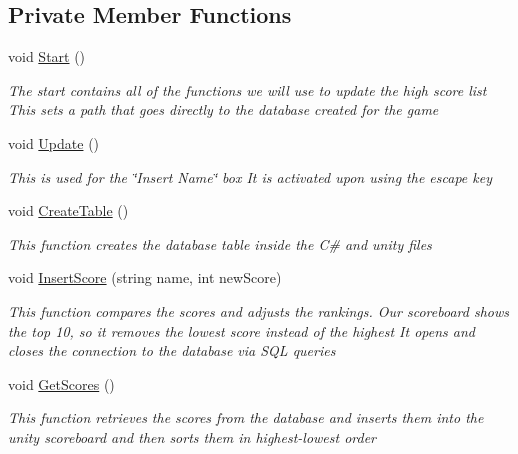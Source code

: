 \subsection*{Private Member Functions}
\begin{DoxyCompactItemize}
\item 
void \mbox{\hyperlink{class_high_score_manager_acee896a71e1b9f5bb9c486d373331df0}{Start}} ()
\begin{DoxyCompactList}\small\item\em The start contains all of the functions we will use to update the high score list This sets a path that goes directly to the database created for the game \end{DoxyCompactList}\item 
void \mbox{\hyperlink{class_high_score_manager_ad75f6456ad76309b4744a3c592da7443}{Update}} ()
\begin{DoxyCompactList}\small\item\em This is used for the \char`\"{}\+Insert Name\char`\"{} box It is activated upon using the escape key \end{DoxyCompactList}\item 
void \mbox{\hyperlink{class_high_score_manager_a4a5a8e7cf5168aba0841c78432294a4a}{Create\+Table}} ()
\begin{DoxyCompactList}\small\item\em This function creates the database table inside the C\# and unity files \end{DoxyCompactList}\item 
void \mbox{\hyperlink{class_high_score_manager_a45ea58b135c4050aedaad4e12ffadbe3}{Insert\+Score}} (string name, int new\+Score)
\begin{DoxyCompactList}\small\item\em This function compares the scores and adjusts the rankings. Our scoreboard shows the top 10, so it removes the lowest score instead of the highest It opens and closes the connection to the database via S\+QL queries \end{DoxyCompactList}\item 
void \mbox{\hyperlink{class_high_score_manager_ac0ebc45a4af433ca6f19c06096bd072f}{Get\+Scores}} ()
\begin{DoxyCompactList}\small\item\em This function retrieves the scores from the database and inserts them into the unity scoreboard and then sorts them in highest-\/lowest order \end{DoxyCompactList}\item 

\end{DoxyCompactItemize}
